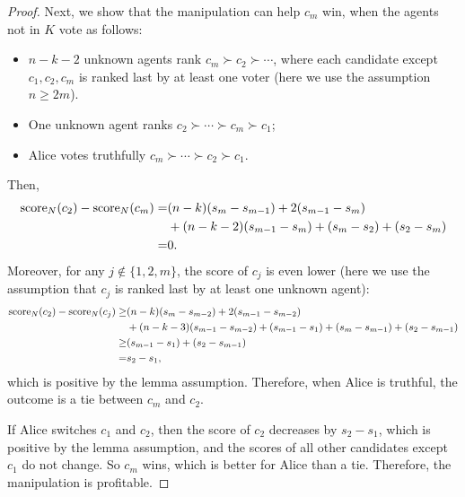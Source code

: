 \begin{proof}
Next, we show that the manipulation can help $c_m$ win, when the agents not in $K$ vote as follows:
\begin{itemize}
\item $n-k-2$ unknown agents rank $c_m\succ c_2\succ \cdots $,
where each candidate except $c_1,c_2,c_m$ is ranked last by at least one voter (here we use the assumption $n\geq 2m$).
\item One unknown agent ranks 
$c_2\succ \cdots \succ c_m \succ c_1$;
\item Alice votes truthfully $c_m\succ  \cdots \succ c_2 \succ c_1$.  
\end{itemize}
Then,
\begin{align*}
\operatorname{score}_N(c_2) - \operatorname{score}_N(c_m)
=&
(n-k)(s_{m}-s_{m-1}) 
+ 2(s_{m-1}-s_{m})
\\
&+
(n-k-2)(s_{m-1}-s_{m}) 
+ (s_m-s_2)
+ (s_2-s_m)
\\
=&
0.
\end{align*}
Moreover, for any $j\not\in\{1,2,m\}$, the score of $c_j$ is even lower (here we use the assumption that $c_j$ is ranked last by at least one unknown agent):
\begin{align*}
\operatorname{score}_N(c_2) - \operatorname{score}_N(c_j)
\geq &
(n-k)(s_{m}-s_{m-2}) 
+ 2(s_{m-1}-s_{m-2})
\\
&+
(n-k-3)(s_{m-1}-s_{m-2}) 
+ (s_{m-1}-s_1)
+ (s_m-s_{m-1})
+ (s_2-s_{m-1})
\\
\geq & (s_{m-1}-s_{1})
+ (s_2-s_{m-1})
\\
= & s_2 - s_1,
\end{align*}
which is positive by the lemma assumption.
Therefore, when Alice is truthful, the outcome is a tie between $c_m$ and $c_2$.

If Alice switches $c_1$ and $c_2$, then the score of $c_2$ decreases by $s_2-s_1$, which is positive by the lemma assumption, and the scores of all other candidates except $c_1$ do not change. So $c_m$ wins, which is better for Alice than a tie.
Therefore, the manipulation is profitable.
\end{proof}
\fi %


